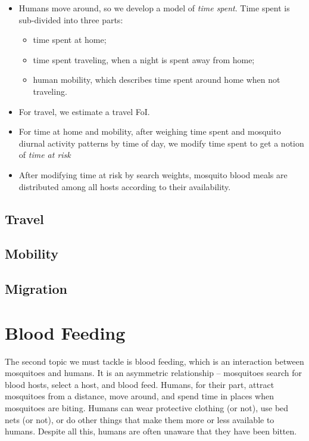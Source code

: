 \documentclass[
]{book}
\begin{document}
\begin{itemize}
\item
  Humans move around, so we develop a model of \emph{time spent}. Time spent is sub-divided into three parts:

  \begin{itemize}
  \item
    time spent at home;
  \item
    time spent traveling, when a night is spent away from home;
  \item
    human mobility, which describes time spent around home when not traveling.
  \end{itemize}
\item
  For travel, we estimate a travel FoI.
\item
  For time at home and mobility, after weighing time spent and mosquito diurnal activity patterns by time of day, we modify time spent to get a notion of \emph{time at risk}
\item
  After modifying time at risk by search weights, mosquito blood meals are distributed among all hosts according to their availability.
\end{itemize}

\hypertarget{travel}{%
\subsection{Travel}\label{travel}}

\hypertarget{mobility}{%
\subsection{Mobility}\label{mobility}}

\hypertarget{migration}{%
\subsection{Migration}\label{migration}}

\hypertarget{blood-feeding}{%
\section{Blood Feeding}\label{blood-feeding}}

The second topic we must tackle is blood feeding, which is an interaction between mosquitoes and humans. It is an asymmetric relationship -- mosquitoes search for blood hosts, select a host, and blood feed. Humans, for their part, attract mosquitoes from a distance, move around, and spend time in places when mosquitoes are biting. Humans can wear protective clothing (or not), use bed nets (or not), or do other things that make them more or less available to humans. Despite all this, humans are often unaware that they have been bitten.
\end{document}
